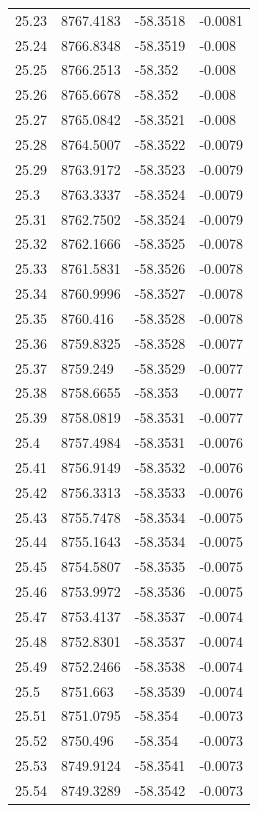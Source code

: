 \begin{table}[H]
\begin{tabular}{llll}
25.23 & 8767.4183 & -58.3518 & -0.0081 \\
25.24 & 8766.8348 & -58.3519 & -0.008 \\
25.25 & 8766.2513 & -58.352 & -0.008 \\
25.26 & 8765.6678 & -58.352 & -0.008 \\
25.27 & 8765.0842 & -58.3521 & -0.008 \\
25.28 & 8764.5007 & -58.3522 & -0.0079 \\
25.29 & 8763.9172 & -58.3523 & -0.0079 \\
25.3 & 8763.3337 & -58.3524 & -0.0079 \\
25.31 & 8762.7502 & -58.3524 & -0.0079 \\
25.32 & 8762.1666 & -58.3525 & -0.0078 \\
25.33 & 8761.5831 & -58.3526 & -0.0078 \\
25.34 & 8760.9996 & -58.3527 & -0.0078 \\
25.35 & 8760.416 & -58.3528 & -0.0078 \\
25.36 & 8759.8325 & -58.3528 & -0.0077 \\
25.37 & 8759.249 & -58.3529 & -0.0077 \\
25.38 & 8758.6655 & -58.353 & -0.0077 \\
25.39 & 8758.0819 & -58.3531 & -0.0077 \\
25.4 & 8757.4984 & -58.3531 & -0.0076 \\
25.41 & 8756.9149 & -58.3532 & -0.0076 \\
25.42 & 8756.3313 & -58.3533 & -0.0076 \\
25.43 & 8755.7478 & -58.3534 & -0.0075 \\
25.44 & 8755.1643 & -58.3534 & -0.0075 \\
25.45 & 8754.5807 & -58.3535 & -0.0075 \\
25.46 & 8753.9972 & -58.3536 & -0.0075 \\
25.47 & 8753.4137 & -58.3537 & -0.0074 \\
25.48 & 8752.8301 & -58.3537 & -0.0074 \\
25.49 & 8752.2466 & -58.3538 & -0.0074 \\
25.5 & 8751.663 & -58.3539 & -0.0074 \\
25.51 & 8751.0795 & -58.354 & -0.0073 \\
25.52 & 8750.496 & -58.354 & -0.0073 \\
25.53 & 8749.9124 & -58.3541 & -0.0073 \\
25.54 & 8749.3289 & -58.3542 & -0.0073 \\

\end{tabular}
\end{table}
